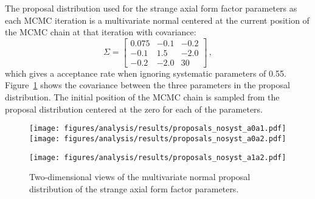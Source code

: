     The proposal distribution used for the strange axial form factor parameters
    as each MCMC iteration is a multivariate normal centered at the current
    position of the MCMC chain at that iteration with covariance:
    \begin{equation}\label{eq:axproposal}
      \Sigma = 
      \begin{bmatrix}
        0.075 & -0.1 & -0.2 \\
        -0.1  &  1.5 & -2.0 \\
        -0.2  & -2.0 &  30  
      \end{bmatrix} \,,
    \end{equation}
    which gives a acceptance rate when ignoring systematic parameters of 0.55.
    Figure~\ref{fig:gasproposals} shows the covariance between the three
    parameters in the proposal distribution. The initial position of the MCMC
    chain is sampled from the proposal distribution centered at the zero for
    each of the parameters.
    \begin{figure}[h]
      \texttt{[image: figures/analysis/results/proposals\_nosyst\_a0a1.pdf]}
      \hspace{2pt}
      \texttt{[image: figures/analysis/results/proposals\_nosyst\_a0a2.pdf]}
      \begin{flushright}
      \texttt{[image: figures/analysis/results/proposals\_nosyst\_a1a2.pdf]}
      \end{flushright} 
      \caption{Two-dimensional views of the multivariate normal proposal
      distribution of the strange axial form factor parameters.}
      \label{fig:gasproposals}
    \end{figure}

